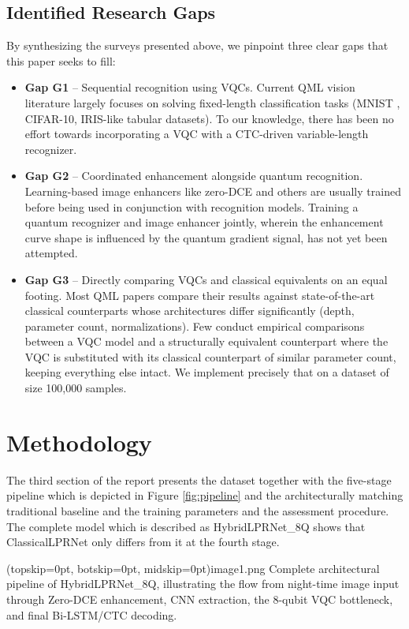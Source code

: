 \documentclass{ieeeaccess}
\begin{document}
\subsection{Identified Research Gaps}
By synthesizing the surveys presented above, we pinpoint three clear gaps that this paper seeks to fill:
\begin{itemize}
\item \textbf{Gap G1} -- Sequential recognition using VQCs. Current QML vision literature largely focuses on solving fixed-length classification tasks (MNIST \cite{b11}, CIFAR-10, IRIS-like tabular datasets). To our knowledge, there has been no effort towards incorporating a VQC with a CTC-driven variable-length recognizer.
\item \textbf{Gap G2} -- Coordinated enhancement alongside quantum recognition. Learning-based image enhancers like zero-DCE \cite{b2} and others are usually trained before being used in conjunction with recognition models. Training a quantum recognizer and image enhancer jointly, wherein the enhancement curve shape is influenced by the quantum gradient signal, has not yet been attempted.
\item \textbf{Gap G3} -- Directly comparing VQCs and classical equivalents on an equal footing. Most QML papers compare their results against state-of-the-art classical counterparts whose architectures differ significantly (depth, parameter count, normalizations). Few conduct empirical comparisons between a VQC model and a structurally equivalent counterpart where the VQC is substituted with its classical counterpart of similar parameter count, keeping everything else intact. We implement precisely that on a dataset of size 100,000 samples.
\end{itemize}

\section{Methodology}
The third section of the report presents the dataset together with the five-stage pipeline which is depicted in Figure \ref{fig:pipeline} and the architecturally matching traditional baseline and the training parameters and the assessment procedure. The complete model which is described as HybridLPRNet\_8Q shows that ClassicalLPRNet only differs from it at the fourth stage.

\Figure[htbp](topskip=0pt, botskip=0pt, midskip=0pt){image1.png}
{Complete architectural pipeline of HybridLPRNet\_8Q, illustrating the flow from night-time image input through Zero-DCE enhancement, CNN extraction, the 8-qubit VQC bottleneck, and final Bi-LSTM/CTC decoding.\label{fig:pipeline}}
\end{document}
